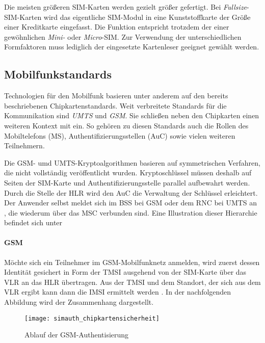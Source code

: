 Die meisten größeren SIM-Karten werden gezielt größer gefertigt. Bei \textit{Fullsize}-SIM-Karten
wird das eigentliche SIM-Modul in eine Kunststoffkarte der Größe einer Kreditkarte eingefasst.
Die Funktion entspricht trotzdem der einer gewöhnlichen \textit{Mini-} oder \textit{Micro}-SIM.
Zur Verwendung der unterschiedlichen Formfaktoren muss lediglich der eingesetzte Kartenleser
geeignet gewählt werden.


\subsection{Mobilfunkstandards} %
Technologien für den Mobilfunk basieren unter anderem auf den bereits beschriebenen
Chipkartenstandards. Weit verbreitete Standards für die Kommunikation sind
\textit{UMTS} und \textit{GSM}. Sie schließen neben den Chipkarten einen weiteren
Kontext mit ein. So gehören zu diesen Standards auch die Rollen des Mobiltelefons (\ac{MS}),
Authentifizierungsstellen (\ac{AuC}) sowie vielen weiteren Teilnehmern.

Die GSM- umd UMTS-Kryptoalgorithmen basieren auf symmetrischen Verfahren, die nicht
vollständig veröffentlicht wurden. Kryptoschlüssel müssen deshalb auf
Seiten der SIM-Karte und Authentifizierungsstelle parallel aufbewahrt werden.
Durch die Stelle der \ac{HLR} wird den \ac{AuC} die Verwaltung der Schlüssel erleichtert.
Der Anwender selbst meldet sich im \ac{BSS} bei GSM oder dem \ac{RNC} bei UMTS an \cite{spitz11},
die wiederum über das \ac{MSC} verbunden sind. Eine Illustration dieser Hierarchie
befindet sich unter 

\paragraph{GSM}
Möchte sich ein Teilnehmer im GSM-Mobilfunknetz anmelden, wird zuerst dessen Identität
gesichert in Form der \ac{TMSI} ausgehend von der SIM-Karte über das \ac{VLR} an das
\ac{HLR} übertragen. Aus der \ac{TMSI} und dem Standort, der sich aus dem \ac{VLR}
ergibt kann dann die \ac{IMSI} ermittelt werden \cite{spitz11}. In der
nachfolgenden Abbildung wird der Zusammenhang dargestellt.

\begin{figure}[htp]
 \begin{center}
  \texttt{[image: simauth\_chipkartensicherheit]}
 \end{center}
 \caption[Ablauf der GSM-Authentisierung]{Ablauf der GSM-Authentisierung \cite{spitz11}}
 \label{abb:simauth}
\end{figure}

